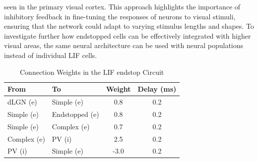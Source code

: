\documentclass[12pt]{article}
\begin{document}
seen in the primary visual cortex. This approach highlights the importance of inhibitory feedback in fine-tuning the responses of neurons to visual stimuli, ensuring that the network could adapt to varying stimulus lengths and shapes. To investigate further how endstopped cells can be effectively integrated with higher visual areas, the same neural architecture can be used with neural populations instead of individual LIF cells. 

\begin{table}[h]
  \centering
  \caption{Connection Weights in the LIF endstop Circuit}
  \begin{tabular}{@{}llcc@{}}
      \toprule
      \textbf{From} & \textbf{To} & \textbf{Weight} & \textbf{Delay (ms)} \\ \midrule
      dLGN (e) & Simple (e) & 0.8 & 0.2 \\
      Simple (e) & Endstopped (e) & 0.8 & 0.2 \\
      Simple (e) & Complex (e) & 0.7 & 0.2 \\
      Complex (e) & PV (i) & 2.5 & 0.2 \\
      PV (i) & Simple (e) & -3.0 & 0.2 \\ \bottomrule
  \end{tabular}
\end{table}
\end{document}
